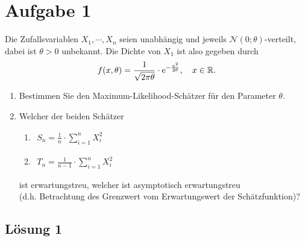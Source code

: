 \documentclass[main.tex]{subfiles}
\begin{document}
\section{Aufgabe 1}
Die Zufallsvariablen $X_1, \cdots, X_n$ seien unabhängig und jeweils $\mathcal{N}(0; \theta)$-verteilt, dabei ist $\theta > 0$ unbekannt. Die Dichte von $X_1$ ist also gegeben durch 
$$ 
f(x, \theta) 
= \frac{1}{\sqrt{2 \pi \theta}} \cdot \operatorname{\mathrm{e}}^{-\frac{x^2}{2 \theta}}, 
\quad x\in \mathbb{R}. 
$$
\begin{enumerate}
\item Bestimmen Sie den Maximum-Likelihood-Schätzer für den Parameter $\theta$.
\item Welcher der beiden Schätzer 
\begin{enumerate}
  	\item $\begin{aligned} S_n = \frac{1}{n} \cdot \sum \limits_{i=1}^{n} X_i^2 \end{aligned}$	
  	\item $\begin{aligned} T_n = \frac{1}{n-1} \cdot \sum \limits_{i=1}^{n} X_i^2 \end{aligned}$
\end{enumerate}
 ist erwartungstreu, welcher ist asymptotisch erwartungstreu \\
 (d.h. Betrachtung des Grenzwert vom Erwartungswert der Schätzfunktion)?
\end{enumerate}

\subsection{Lösung 1}
\end{document}
